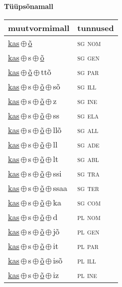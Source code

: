 

\vspace{3.5em}
\noindent \begin{minipage}{\textwidth}
\noindent \textbf{Tüüpsõnamall \,}\\

\begin{sideways}
\begin{tabular}{l l}
muutvormimall & tunnused \\
\hline
\underline{kas}\,$\oplus$\,\underline{õ} & \textsc{ sg nom } \\
\underline{kas}\,$\oplus$\,s\,$\oplus$\,\underline{õ} & \textsc{ sg gen } \\
\underline{kas}\,$\oplus$\,\underline{õ}\,$\oplus$\,ttõ & \textsc{ sg par } \\
\underline{kas}\,$\oplus$\,s\,$\oplus$\,\underline{õ}\,$\oplus$\,sõ & \textsc{ sg ill } \\
\underline{kas}\,$\oplus$\,s\,$\oplus$\,\underline{õ}\,$\oplus$\,z & \textsc{ sg ine } \\
\underline{kas}\,$\oplus$\,s\,$\oplus$\,\underline{õ}\,$\oplus$\,ss & \textsc{ sg ela } \\
\underline{kas}\,$\oplus$\,s\,$\oplus$\,\underline{õ}\,$\oplus$\,llõ & \textsc{ sg all } \\
\underline{kas}\,$\oplus$\,s\,$\oplus$\,\underline{õ}\,$\oplus$\,ll & \textsc{ sg ade } \\
\underline{kas}\,$\oplus$\,s\,$\oplus$\,\underline{õ}\,$\oplus$\,lt & \textsc{ sg abl } \\
\underline{kas}\,$\oplus$\,s\,$\oplus$\,\underline{õ}\,$\oplus$\,ssi & \textsc{ sg tra } \\
\underline{kas}\,$\oplus$\,s\,$\oplus$\,\underline{õ}\,$\oplus$\,ssaa & \textsc{ sg ter } \\
\underline{kas}\,$\oplus$\,s\,$\oplus$\,\underline{õ}\,$\oplus$\,ka & \textsc{ sg com } \\
\underline{kas}\,$\oplus$\,s\,$\oplus$\,\underline{õ}\,$\oplus$\,d & \textsc{ pl nom } \\
\underline{kas}\,$\oplus$\,s\,$\oplus$\,\underline{õ}\,$\oplus$\,jõ & \textsc{ pl gen } \\
\underline{kas}\,$\oplus$\,s\,$\oplus$\,\underline{õ}\,$\oplus$\,it & \textsc{ pl par } \\
\underline{kas}\,$\oplus$\,s\,$\oplus$\,\underline{õ}\,$\oplus$\,isõ & \textsc{ pl ill } \\
\underline{kas}\,$\oplus$\,s\,$\oplus$\,\underline{õ}\,$\oplus$\,iz & \textsc{ pl ine } \\

\end{tabular}
\end{sideways}
\end{minipage}
